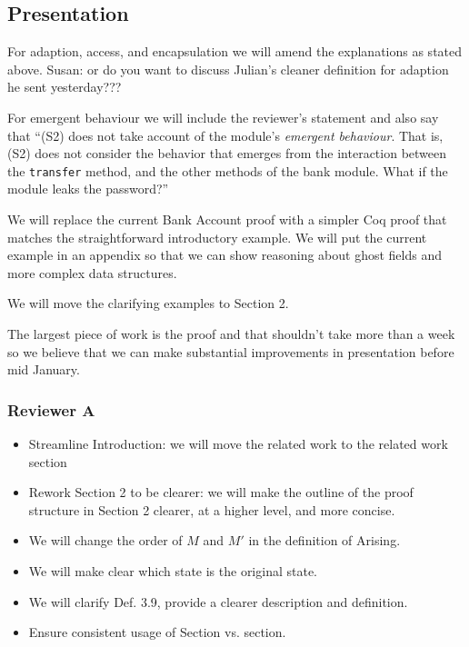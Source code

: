 \documentclass[11pt]{amsart}
\begin{document}
 \subsection*{Presentation}
 
 For adaption, access, and encapsulation we will amend the explanations as stated above. Susan: or do you want to discuss Julian's cleaner definition for adaption he sent yesterday???
 
 For emergent behaviour we will include the reviewer's statement and also say that ``(S2) does not take account of the module's \emph{emergent behaviour}. That is, (S2) does not consider the behavior that emerges from the interaction between the 
\texttt{transfer} method, and the other methods of the bank module. What if the module leaks the password?''
 
 We will replace the current Bank Account proof with a simpler Coq proof that matches the straightforward introductory example. We will put the current example in an appendix so that we can 
show reasoning about ghost fields and more complex data structures. 

We will move the clarifying examples to Section 2.

The largest piece of work is the proof and that shouldn't take more than a week so we believe that we can make substantial improvements in presentation before mid January.


\subsubsection*{Reviewer A}
\begin{itemize}
\item Streamline Introduction: we will move the related work to the related work section
\item Rework Section 2 to be clearer: we will make the outline of the proof structure in Section 2 clearer, at a higher level, and more concise.
\item We will change the order of $M$ and $M'$ in the definition of Arising.
\item We will make clear which state is the original state.
\item We will clarify Def. 3.9, provide a clearer description and definition.
\item Ensure consistent usage of Section vs. section.
\end{itemize}
\end{document}
